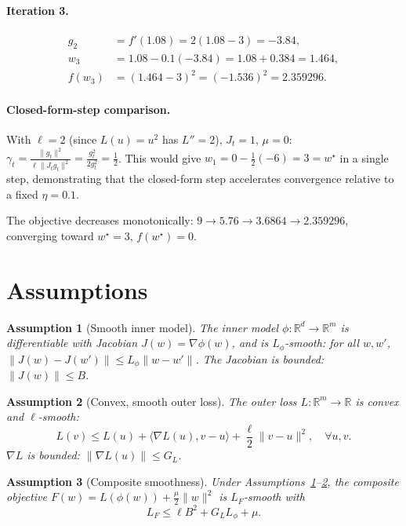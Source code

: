 \documentclass[11pt]{article}
\newtheorem{assumption}{Assumption}
\begin{document}
\paragraph{Iteration 3.}
\begin{align*}
g_2 &= f'(1.08) = 2(1.08-3) = -3.84,\\
w_3 &= 1.08 - 0.1(-3.84) = 1.08 + 0.384 = 1.464,\\
f(w_3) &= (1.464-3)^2 = (-1.536)^2 = 2.359296.
\end{align*}

\paragraph{Closed-form-step comparison.}
With $\ell = 2$ (since $L(u)=u^2$ has $L''=2$), $J_t=1$, $\mu=0$:
$\gamma_t = \frac{\|g_t\|^2}{\ell\|J_t g_t\|^2}
= \frac{g_t^2}{2 g_t^2} = \tfrac12$.
This would give $w_1 = 0 - \tfrac12(-6) = 3 = w^\star$ in a single step,
demonstrating that the closed-form step accelerates convergence relative to a
fixed $\eta=0.1$.

\medskip
The objective decreases monotonically:
$9 \to 5.76 \to 3.6864 \to 2.359296$, converging toward $w^\star = 3$,
$f(w^\star)=0$.

\section*{Assumptions}

\begin{assumption}[Smooth inner model]\label{as:inner}
The inner model $\phi:\mathbb{R}^d\to\mathbb{R}^m$ is differentiable with Jacobian
$J(w)=\nabla\phi(w)$, and is $L_\phi$-smooth: for all $w,w'$,
$\|J(w)-J(w')\| \le L_\phi \|w-w'\|$. The Jacobian is bounded:
$\|J(w)\| \le B$.
\end{assumption}

\begin{assumption}[Convex, smooth outer loss]\label{as:outer}
The outer loss $L:\mathbb{R}^m\to\mathbb{R}$ is convex and $\ell$-smooth:
\[
L(v) \le L(u) + \langle \nabla L(u), v-u\rangle + \frac{\ell}{2}\|v-u\|^2,
\quad \forall u,v .
\]
$\nabla L$ is bounded: $\|\nabla L(u)\| \le G_L$.
\end{assumption}

\begin{assumption}[Composite smoothness]\label{as:comp}
Under Assumptions~\ref{as:inner}--\ref{as:outer}, the composite objective
$F(w)=L(\phi(w))+\tfrac{\mu}{2}\|w\|^2$ is $L_F$-smooth with
\[
L_F \le \ell B^2 + G_L L_\phi + \mu .
\]
\end{assumption}
\end{document}
